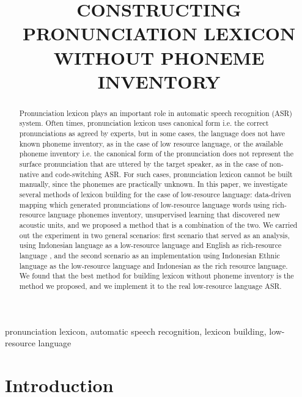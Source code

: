 \documentclass{article}
\title{CONSTRUCTING PRONUNCIATION LEXICON WITHOUT PHONEME INVENTORY}
\begin{document}
%
\maketitle
%
\begin{abstract}
Pronunciation lexicon plays an important role in automatic speech recognition (ASR) system.
Often times, pronunciation lexicon uses canonical form i.e. the correct pronunciations as agreed 
by experts, but in some cases, the language does not have known phoneme inventory, as in the case 
of low resource language, or the available phoneme inventory i.e. the canonical form of the pronunciation
does not represent the surface pronunciation that are uttered by the target speaker, as in the case of 
non-native and code-switching ASR. For such cases, pronunciation lexicon cannot be built manually, 
since the phonemes are practically unknown. In this paper, we investigate several methods of lexicon 
building for the case of low-resource language: data-driven mapping which generated 
pronunciations of low-resource language words using rich-resource language phonemes inventory, 
unsupervised learning that discovered new acoustic units, and we proposed a method that is a 
combination of the two. We carried out the experiment in two general scenarios: first scenario that served
as an analysis, using Indonesian language as a low-resource language and English as rich-resource language
, and the second scenario as an implementation using Indonesian Ethnic language as the low-resource 
language and Indonesian as the rich resource language. We found that the best method for building lexicon without phoneme inventory is the method we proposed, and we implement
it to the real low-resource language ASR.

\end{abstract}
%
\begin{keywords}
pronunciation lexicon, automatic speech recognition, lexicon building, low-resource language
\end{keywords}
%
\section{Introduction}
\label{sec:intro}
\end{document}
